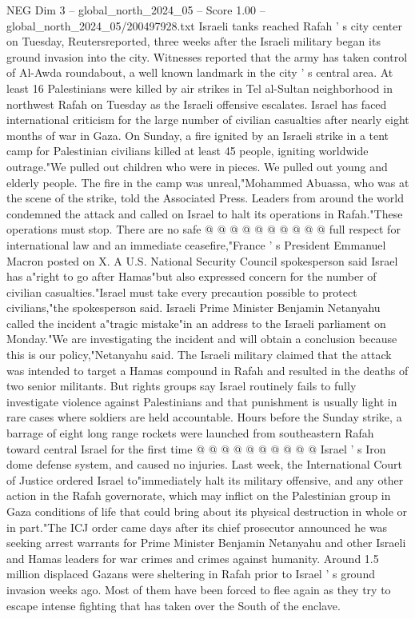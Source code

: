\begin{textsample}{NEG Dim 3 – global\_north\_2024\_05 – Score 1.00 – global\_north\_2024\_05/200497928.txt}  \label{ex:f3_neg_445}
Israeli tanks reached Rafah ' s city center on Tuesday, Reutersreported, three weeks after the Israeli military began its ground invasion into the city.
Witnesses reported that the army has taken control of Al-Awda roundabout, a well known landmark in the city ' s central area.
At least 16 Palestinians were killed by air strikes in Tel al-Sultan neighborhood in northwest Rafah on Tuesday as the Israeli offensive escalates.
Israel has faced international criticism for the large number of civilian casualties after nearly eight months of war in Gaza.
On Sunday, a fire ignited by an Israeli strike in a tent camp for Palestinian civilians killed at least 45 people, igniting worldwide outrage."We pulled out children who were in pieces.
We pulled out young and elderly people.
The fire in the camp was unreal,"Mohammed Abuassa, who was at the scene of the strike, told the Associated Press.
Leaders from around the world condemned the attack and called on Israel to halt its operations in Rafah."These operations must stop.
There are no safe @ @ @ @ @ @ @ @ @ @ full respect for international law and an immediate ceasefire,"France ' s President Emmanuel Macron posted on X.
A U.S.
National Security Council spokesperson said Israel has a"right to go after Hamas"but also expressed concern for the number of civilian casualties."Israel must take every precaution possible to protect civilians,"the spokesperson said.
Israeli Prime Minister Benjamin Netanyahu called the incident a"tragic mistake"in an address to the Israeli parliament on Monday."We are investigating the incident and will obtain a conclusion because this is our policy,"Netanyahu said.
The Israeli military claimed that the attack was intended to target a Hamas compound in Rafah and resulted in the deaths of two senior militants.
But rights groups say Israel routinely fails to fully investigate violence against Palestinians and that punishment is usually light in rare cases where soldiers are held accountable.
Hours before the Sunday strike, a barrage of eight long range rockets were launched from southeastern Rafah toward central Israel for the first time @ @ @ @ @ @ @ @ @ @ Israel ' s Iron dome defense system, and caused no injuries.
Last week, the International Court of Justice ordered Israel to"immediately halt its military offensive, and any other action in the Rafah governorate, which may inflict on the Palestinian group in Gaza conditions of life that could bring about its physical destruction in whole or in part."The ICJ order came days after its chief prosecutor announced he was seeking arrest warrants for Prime Minister Benjamin Netanyahu and other Israeli and Hamas leaders for war crimes and crimes against humanity.
Around 1.5 million displaced Gazans were sheltering in Rafah prior to Israel ' s ground invasion weeks ago.
Most of them have been forced to flee again as they try to escape intense fighting that has taken over the South of the enclave.

\end{textsample}
